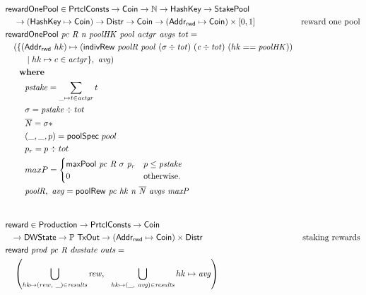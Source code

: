 \begin{figure}[htb]
  \begin{align*}
      & \fun{rewardOnePool} \in \PrtclConsts \to \Coin \to \mathbb{N} \to \HashKey \to \StakePool\\
      & ~~~\to (\HashKey \mapsto \Coin)\to \Distr \to \Coin \to (\AddrRWD \mapsto \Coin)\times[0, 1]
      & \text{reward one pool} \\
      & \fun{rewardOnePool}~\var{pc}~\var{R}~\var{n}~\var{poolHK}~\var{pool}
        ~\var{actgr}~\var{avgs}~\var{tot} = \\
      & ~~~(\{ (\AddrRWD~hk)\mapsto ( \fun{indivRew}~\var{poolR}~\var{pool}
                                 ~(\sigma\div\var{tot})~(\var{c}\div\var{tot})~(hk ==\var{poolHK})) \\
      & ~~~~~~~\mid hk\mapsto c\in\var{actgr}\},~\var{avg})\\
      & ~~~\where \\
      & ~~~~~~~\var{pstake} = \sum_{\_\mapsto t\in\var{actgr}} t \\
      & ~~~~~~~\sigma = \var{pstake} \div tot \\
      & ~~~~~~~\var{\overline{N}} = \sigma * \\
      & ~~~~~~~(\_, \_, p) = \fun{poolSpec}~pool \\
      & ~~~~~~~p_{r} = p \div tot \\
      & ~~~~~~~maxP =
      \begin{cases}
          \fun{maxPool}~\var{pc}~\var{R}~\sigma~\var{p_r}&
              p \leq \var{pstake}\\
          0 & \text{otherwise.}
        \end{cases} \\
      & ~~~~~~~\var{poolR},~\var{avg} = \fun{poolRew}~\var{pc}~\var{hk}~\var{n}~\var{\overline{N}}~\var{avgs}~\var{maxP} \\
      \nextdef
      & \fun{reward} \in \Production \to \PrtclConsts \to \Coin \\
      & ~~ \to \DWState \to \powerset{\TxOut} \to (\AddrRWD \mapsto \Coin)\times\Distr
      & \text{staking rewards} \\
      & \fun{reward}~\var{prod}~\var{pc}~\var{R}~\var{dwstate}~\var{outs} = \\
      & ~~~\left(
           \bigcup_{hk\mapsto(rew,~\_)\in\var{results}} \var{rew},
           ~~\bigcup_{hk\mapsto(\_,~\var{avg})\in\var{results}} hk\mapsto\var{avg}
           \right)\\

\end{align*}
\end{figure}
